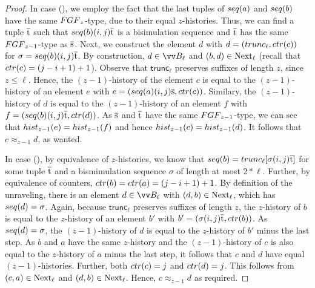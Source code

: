 \begin{proof}
  In case (), we employ the fact that the last tuples of $\seq{a}$ and $\seq{b}$ have the same $\FGF_{z}$-type, due to their equal $z$-histories.
  Thus, we can find a tuple $\overline{\mathrm{t}}$ such that $\seq{b} (i,j) \elemtuplet$ is a bisimulation sequence and $\overline{\mathrm{t}}$ has the same $\FGF_{z-1}$-type as $\overline{\mathrm{s}}$.
  Next, we construct the element $d$ with $d = (\mathsf{trunc}_{\ell}, \ctr{c})$ for $\sigma = \seq{b}(i,j)\elemtuplet$.
  By construction, $d \in \unraveldom{B}_{\ell}$ and $(b,d) \in \mathrm{Next}_{\ell}$ (recall that $\ctr{c} = (j-i+1)+1$).
  Observe that $\mathsf{trunc}_{\ell}$ preserves suffixes of length $z$, since $z \le \ell$.
  Hence, the $(z-1)$-history of the element $c$ is equal to the $(z-1)$-history of an element $e$ with $e = (\seq{a}(i,j)\elemtuples, \ctr{c})$.
  Similary, the $(z-1)$-history of $d$ is equal to the $(z-1)$-history of an element $f$ with $f = (\seq{b}(i,j)\elemtuplet, \ctr{d})$.
  As $\overline{\mathrm{s}}$ and $\overline{\mathrm{t}}$ have the same $\FGF_{z-1}$-type, we can see that $\hist{z-1}{e} = \hist{z-1}{f}$ and hence $\hist{z-1}{c} = \hist{z-1}{d}$.
  It follows that $c \approx_{z-1} d$, as wanted.

  In case (), by equivalence of $z$-histories, we know that $\seq{b} = \mathsf{trunc}_{\ell}[\sigma(i,j)\elemtuplet]$ for some tuple $\overline{\mathrm{t}}$ and a bismimulation sequence $\sigma$ of length at most $2 * \ell$.
  Further, by equivalence of counters, $\ctr{b} = \ctr{a} = (j-i+1) + 1$.
  By definition of the unraveling, there is an element $d \in \unraveldom{B}_{\ell}$ with $(d,b) \in \mathrm{Next}_{\ell}$, which has $\seq{d} = \sigma$.
  Again, because $\mathsf{trunc}_{\ell}$ preserves suffixes of length $z$, the $z$-history of $b$ is equal to the $z$-history of an element $b'$ with $b' = (\sigma(i,j)\elemtuplet, \ctr{b})$.
  As $\seq{d} = \sigma$, the $(z-1)$-history of $d$ is equal to the $z$-history of $b'$ minus the last step.
  As $b$ and $a$ have the same $z$-history and the $(z-1)$-history of $c$ is also equal to the $z$-history of $a$ minus the last step, it follows that $c$ and $d$ have equal $(z-1)$-histories.
  Further, both $\ctr{c} = j$ and $\ctr{d} = j$.
  This follows from $(c,a) \in \mathrm{Next}_{\ell}$ and $(d,b) \in \mathrm{Next}_{\ell}$.
  Hence, $c \approx_{z-1} d$ as required.
\end{proof}

